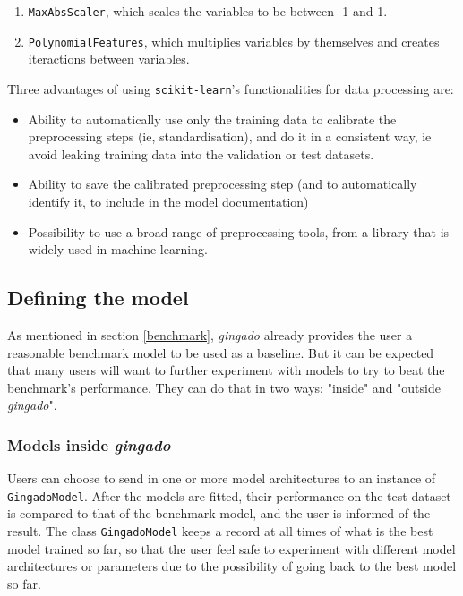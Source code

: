 \documentclass{article}
\begin{document}
 \begin{enumerate}
        \item \texttt{MaxAbsScaler}, which scales the variables to be between -1 and 1. 
        \item \texttt{PolynomialFeatures}, which multiplies variables by themselves and creates iteractions between variables.
    \end{enumerate}

Three advantages of using \texttt{scikit-learn}'s functionalities for data processing are:
\begin{itemize}
    \item Ability to automatically use only the training data to calibrate the preprocessing steps (ie, standardisation), and do it in a consistent way, ie avoid leaking training data into the validation or test datasets.
    \item Ability to save the calibrated preprocessing step (and to automatically identify it, to include in the model documentation)
    \item Possibility to use a broad range of preprocessing tools, from a library that is widely used in machine learning.
\end{itemize}




\subsection{Defining the model}

As mentioned in section \ref{benchmark}, \textit{gingado} already provides the user a reasonable benchmark model to be used as a baseline. But it can be expected that many users will want to further experiment with models to try to beat the benchmark's performance. They can do that in two ways: "inside" and "outside \textit{gingado}".

\subsubsection{Models inside \textit{gingado}}

Users can choose to send in one or more model architectures to an instance of \texttt{GingadoModel}. After the models are fitted, their performance on the test dataset is compared to that of the benchmark model, and the user is informed of the result. The class \texttt{GingadoModel} keeps a record at all times of what is the best model trained so far, so that the user feel safe to experiment with different model architectures or parameters due to the possibility of going back to the best model so far.
\end{document}
